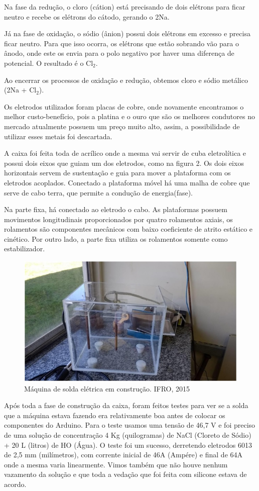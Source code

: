 \documentclass[article,12pt,onesidea,4paper,english,brazil]{abntex2}
\begin{document}
Na fase da redução, o cloro (cátion) está precisando de dois elétrons para ficar
neutro e recebe os elétrons do cátodo, gerando o 2Na.

Já na fase de oxidação, o sódio (ânion) possui dois elétrons em excesso e
precisa ficar neutro. Para que isso ocorra, os elétrons que estão sobrando vão para
o ânodo, onde este os envia para o polo negativo por haver uma diferença de
potencial. O resultado é o Cl$_2$.

Ao encerrar os processos de oxidação e redução, obtemos cloro e sódio
metálico (2Na + Cl$_2$).

Os eletrodos utilizados foram placas de cobre, onde novamente encontramos o
melhor custo-benefício, pois a platina e o ouro que são os melhores condutores no
mercado atualmente possuem um preço muito alto, assim, a possibilidade de utilizar
esses metais foi descartada.

A caixa foi feita toda de acrílico onde a mesma vai servir de cuba eletrolítica e
possui dois eixos que guiam um dos eletrodos, como na figura 2. Os dois eixos
horizontais servem de sustentação e guia para mover a plataforma com os eletrodos
acoplados. Conectado a plataforma móvel há uma malha de cobre que serve de
cabo terra, que permite a condução de energia(fase).

Na parte fixa, há conectado ao eletrodo o cabo. As plataformas possuem
movimentos longitudinais proporcionados por quatro rolamentos axiais, os
rolamentos são componentes mecânicos com baixo coeficiente de atrito estático e
cinético. Por outro lado, a parte fixa utiliza os rolamentos somente como
estabilizador.

\begin{figure}[h]
	\centering
	\includegraphics[width=0.7\linewidth]{pip-68-01}
	\caption{Máquina de solda elétrica em construção. IFRO, 2015}
	\label{fig:pip-68-01}
\end{figure}

Após toda a fase de construção da caixa, foram feitos testes para ver se a
solda que a máquina estava fazendo era relativamente boa antes de colocar os
componentes do Arduino. Para o teste usamos uma tensão de 46,7 V e foi preciso de uma solução de concentração 4 Kg (quilogramas) de NaCl (Cloreto
de Sódio) + 20 L (litros) de HO (Água). O teste foi um sucesso, derretendo
eletrodos 6013 de 2,5 mm (milímetros), com corrente inicial de 46A (Ampére) e
final de 64A onde a mesma varia linearmente. Vimos também que não houve
nenhum vazamento da solução e que toda a vedação que foi feita com silicone
estava de acordo.
\end{document}
